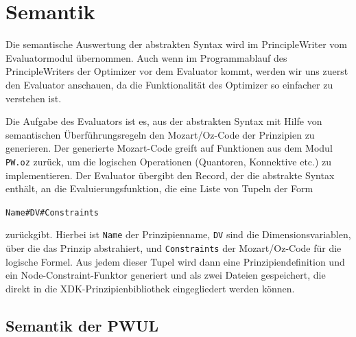 \section{Semantik}

Die semantische Auswertung der abstrakten Syntax wird im
PrincipleWriter vom Evaluatormodul \"ubernommen. Auch wenn im
Programmablauf des PrincipleWriters der Optimizer vor dem Evaluator
kommt, werden wir uns zuerst den Evaluator anschauen, da die
Funktionalit\"at des Optimizer so einfacher zu verstehen ist.

Die Aufgabe des Evaluators ist es, aus der abstrakten Syntax mit Hilfe
von semantischen \"Uberf\"uhrungsregeln den Mozart/Oz-Code der
Prinzipien zu generieren. Der generierte Mozart-Code greift auf
Funktionen aus dem Modul {\tt PW.oz} zur\"uck, um die logischen
Operationen (Quantoren, Konnektive etc.) zu implementieren.  Der
Evaluator \"ubergibt den Record, der die abstrakte Syntax enth\"alt,
an die Evaluierungsfunktion, die eine Liste von Tupeln der Form
\begin{center}
{\tt Name\#DV\#Constraints}
\end{center}
zur\"uckgibt. Hierbei ist {\tt Name} der Prinzipienname, {\tt DV}
sind die Dimensionsvariablen, \"uber die das Prinzip abstrahiert, und
{\tt Constraints} der Mozart/Oz-Code f\"ur die logische Formel.  Aus
jedem dieser Tupel wird dann eine Prinzipiendefinition und ein
Node-Constraint-Funktor generiert und als zwei Dateien gespeichert,
die direkt in die XDK-Prinzipienbibliothek eingegliedert werden
k\"onnen.

\subsection{Semantik der PWUL}

